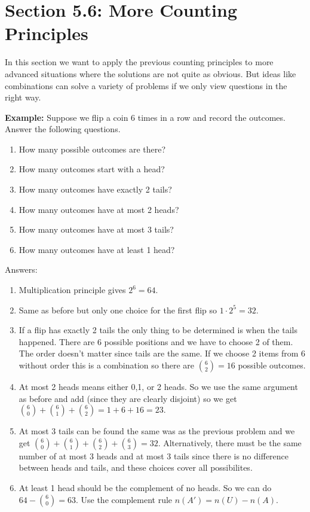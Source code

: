 \documentclass[14,fleqn]{article}
\begin{document}
\section{Section 5.6: More Counting Principles}
In this section we want to apply the previous counting principles to more advanced situations where the solutions are not quite as obvious. But ideas like combinations can solve a variety of problems if we only view questions in the right way.

\textbf{Example:} Suppose we flip a coin 6 times in a row and record the outcomes. Answer the following questions.
\begin{enumerate}
	\item How many possible outcomes are there?
	\item How many outcomes start with a head?
	\item How many outcomes have exactly 2 tails?
	\item How many outcomes have at most 2 heads?
	\item How many outcomes have at most 3 tails?
	\item How many outcomes have at least 1 head?
\end{enumerate}

Answers:
\begin{enumerate}
	\item Multiplication principle gives $2^6=64.$
	\item Same as before but only one choice for the first flip so $1\cdot 2^5=32.$
	\item If a flip has exactly 2 tails the only thing to be determined is when the tails happened. There are 6 possible positions and we have to choose 2 of them. The order doesn't matter since tails are the same. If we choose 2 items from 6 without order this is a combination so there are $\binom{6}{2}=16$ possible outcomes.
	\item At most 2 heads means either 0,1, or 2 heads. So we use the same argument as before and add (since they are clearly disjoint) so we get $\binom{6}{0}+\binom{6}{1}+\binom{6}{2}=1+6+16=23.$
	\item At most 3 tails can be found the same was as the previous problem and we get $\binom{6}{0}+\binom{6}{1}+\binom{6}{2}+\binom{6}{3}=32.$ Alternatively, there must be the same number of at most 3 heads and at most 3 tails since there is no difference between heads and tails, and these choices cover all possibilites.
	\item At least 1 head should be the complement of no heads. So we can do $64-\binom{6}{0}=63.$ Use the complement rule $n(A')=n(U)-n(A).$
\end{enumerate}
\end{document}
